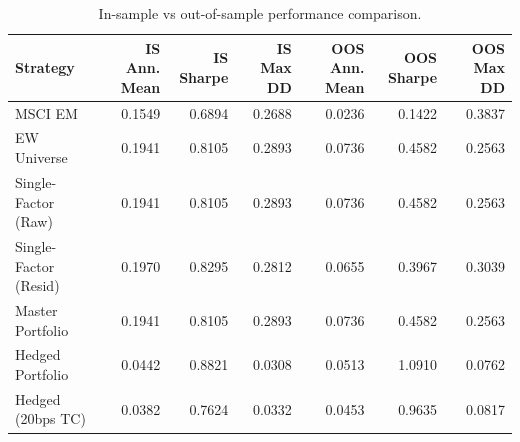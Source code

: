 \begin{table}[htbp]
\centering
\caption{In-sample vs out-of-sample performance comparison.}
\label{tab:is_oos}
\begin{tabular}{lrrrrrr}
\toprule
Strategy & IS Ann. Mean & IS Sharpe & IS Max DD & OOS Ann. Mean & OOS Sharpe & OOS Max DD \\
\midrule
MSCI EM & 0.1549 & 0.6894 & 0.2688 & 0.0236 & 0.1422 & 0.3837 \\
EW Universe & 0.1941 & 0.8105 & 0.2893 & 0.0736 & 0.4582 & 0.2563 \\
Single-Factor (Raw) & 0.1941 & 0.8105 & 0.2893 & 0.0736 & 0.4582 & 0.2563 \\
Single-Factor (Resid) & 0.1970 & 0.8295 & 0.2812 & 0.0655 & 0.3967 & 0.3039 \\
Master Portfolio & 0.1941 & 0.8105 & 0.2893 & 0.0736 & 0.4582 & 0.2563 \\
Hedged Portfolio & 0.0442 & 0.8821 & 0.0308 & 0.0513 & 1.0910 & 0.0762 \\
Hedged (20bps TC) & 0.0382 & 0.7624 & 0.0332 & 0.0453 & 0.9635 & 0.0817 \\
\bottomrule
\end{tabular}
\end{table}
